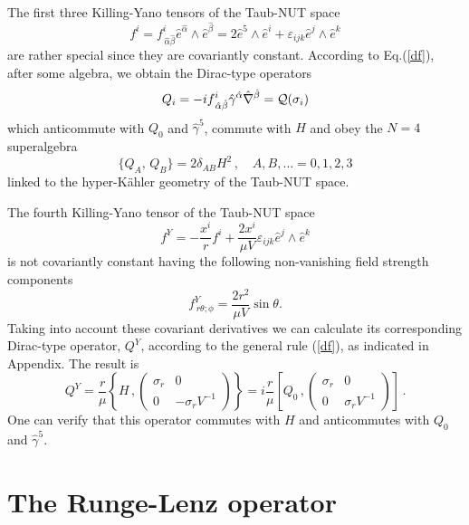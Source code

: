 \documentclass[a4paper,12pt]{article}
\begin{document}
The first three Killing-Yano tensors of the Taub-NUT space \cite{GRFH}
\begin{equation}\label{fi}
f^i 
= f^i_{\,{\hat \alpha}{\hat \beta}} {\hat e}^{\hat \alpha} \wedge 
{\hat e}^{\hat \beta}
= 2 {\hat e}^5\wedge  {\hat e}^i +\varepsilon_{ijk} {\hat e}^j\wedge 
{\hat e}^k
\end{equation}
are rather special since they are covariantly constant. According to 
Eq.(\ref{df}), after some algebra, we obtain the Dirac-type operators  
\begin{equation}
Q_{i}=-if^{i}_{\,\hat\alpha\hat\beta}\hat\gamma^{\hat\alpha}\hat\nabla
^{\hat\beta}={\cal Q}(\sigma_{i})
\end{equation}
which anticommute with $Q_{0}$ and $\hat\gamma^5$, commute with $H$ and 
obey the $N=4$ superalgebra 
\begin{equation}\label{QQH}
\{Q_{A},\,Q_{B}\}=2\delta_{AB}H^2\,, \quad A,B,...=0,1,2,3
\end{equation}  
linked to the hyper-K\" ahler geometry of the Taub-NUT space.

The fourth Killing-Yano tensor of the Taub-NUT space
\begin{equation}\label{fY}
f^{Y}=-\frac{x^i}{r}f^{i}+\frac{2x^i}{\mu V}\varepsilon_{ijk}\hat e^{j}\land
\hat e^{k}
\end{equation}
is not covariantly constant having the following non-vanishing field 
strength components
\begin{equation}\label{stren}
f^{Y}_{\,r\theta;\phi}=\frac{2r^2}{\mu V}\sin\theta.
\end{equation}
Taking into account these covariant derivatives we can calculate its 
corresponding Dirac-type operator, $Q^Y$, according to the 
general rule (\ref{df}), as indicated in  Appendix. The  result is
\begin{equation}\label{dy2}
Q^Y=\frac{r}{\mu}\left\{H\,,\left(
\begin{array}{cc}
\sigma_{r}&0\\
0&-\sigma_{r} V^{-1}
\end{array}\right)
\right\}
=i\frac{r}{\mu}\left[Q_{0}\,,\left(
\begin{array}{cc}
\sigma_{r}&0\\
0& \sigma_{r} V^{-1}
\end{array}\right)
\right]\,.
\end{equation}
One can verify that this operator commutes with $H$ and anticommutes with 
$Q_{0}$ and $\hat\gamma^5$.


\section{The Runge-Lenz operator} 
\end{document}
